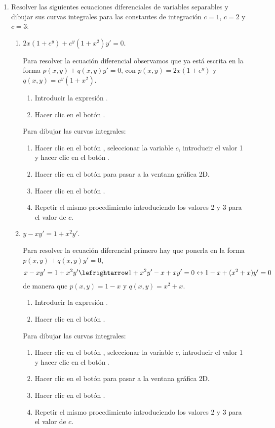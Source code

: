 \begin{enumerate}[leftmargin=*]
\item Resolver las siguientes ecuaciones diferenciales de variables separables y dibujar sus curvas integrales para las
constantes de integración $c=1$, $c=2$ y $c=3$:
\begin{enumerate}
\item $2x(1+e^y)+e^y(1+x^{2})y'=0$.
\begin{indicacion}
{Para resolver la ecuación diferencial observamos que ya está escrita en la forma $p(x,y)+q(x,y)y'=0$, con
$p(x,y)=2x(1+e^y)$ y $q(x,y)=e^y(1+x^{2})$.
\begin{enumerate}
\item Introducir la expresión .
\item Hacer clic en el botón .
\end{enumerate}
Para dibujar las curvas integrales:
\begin{enumerate}[resume]
\item Hacer clic en el botón , seleccionar la variable $c$, introducir el valor 1 y hacer clic en el
botón .
\item Hacer clic en el botón  para pasar a la ventana gráfica 2D.
\item Hacer clic en el botón .
\item Repetir el mismo procedimiento introduciendo los valores 2 y 3 para el valor de $c$.
\end{enumerate}
}
\end{indicacion}

\item $y-xy'=1+x^2y'$.
\begin{indicacion}
{Para resolver la ecuación diferencial primero hay que ponerla en la forma $p(x,y)+q(x,y)y'=0$,
\[
x-xy'=1+x^2y' \lefrightarrow 1+x^2y'-x+xy'=0 \leftrightarrow 1-x+(x^2+x)y'=0
\]
de manera que $p(x,y)=1-x$ y $q(x,y)=x^2+x$.
\begin{enumerate}
\item Introducir la expresión .
\item Hacer clic en el botón .
\end{enumerate}
Para dibujar las curvas integrales:
\begin{enumerate}[resume]
\item Hacer clic en el botón , seleccionar la variable $c$, introducir el valor 1 y hacer clic en el
botón .
\item Hacer clic en el botón  para pasar a la ventana gráfica 2D.
\item Hacer clic en el botón .
\item Repetir el mismo procedimiento introduciendo los valores 2 y 3 para el valor de $c$.
\end{enumerate}
}
\end{indicacion}
\end{enumerate}



\end{enumerate}
